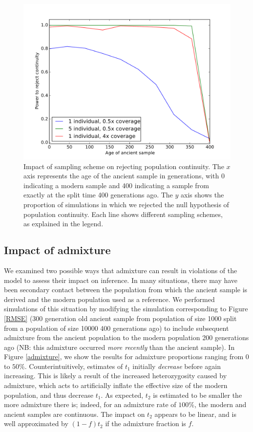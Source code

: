 \documentclass[11pt, oneside]{article}   	%
\begin{document}
\begin{figure}[h] %
   \centering
   \includegraphics[width=\textwidth]{continuity_rejection.pdf} 
   \caption{Impact of sampling scheme on rejecting population continuity. The $x$ axis represents the age of the ancient sample in generations, with 0 indicating a modern sample and 400 indicating a sample from exactly at the split time 400 generations ago. The $y$ axis shows the proportion of simulations in which we rejected the null hypothesis of population continuity. Each line shows different sampling schemes, as explained in the legend.}
   \label{continuity}
\end{figure}

\subsection{Impact of admixture}
We examined two possible ways that admixture can result in violations of the model to assess their impact on inference. In many situations, there may have been secondary contact between the population from which the ancient sample is derived and the modern population used as a reference. We performed simulations of this situation by modifying the simulation corresponding to Figure \ref{RMSE} (300 generation old ancient sample from population of size 1000 split from a population of size 10000 400 generations ago) to include subsequent admixture from the ancient population to the modern population 200 generations ago (NB: this admixture occurred \emph{more recently} than the ancient sample). In Figure \ref{admixture}, we show the results for admixture proportions ranging from $0$ to $50\%$. Counterintuitively, estimates of $t_1$ initially \emph{decrease} before again increasing. This is likely a result of the increased heterozygosity caused by admixture, which acts to artificially inflate the effective size of the modern population, and thus decrease $t_1$. As expected, $t_2$ is estimated to be smaller the more admixture there is; indeed, for an admixture rate of $100\%$, the modern and ancient samples are continuous. The impact on $t_2$ appears to be linear, and is well approximated by $(1-f)t_2$ if the admixture fraction is $f$. 
\end{document}
